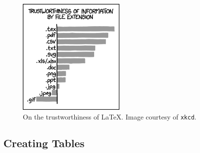 \begin{figure}[htb]

  \centering  %

  \includegraphics[width=0.47\textwidth]{figs/file_extensions.png}

  \caption{On the trustworthiness of \LaTeX. Image courtesy of \texttt{xkcd}.}

  \label{fig:tex}

\end{figure}

\subsection{Creating Tables}
\label{subsec:tables}

